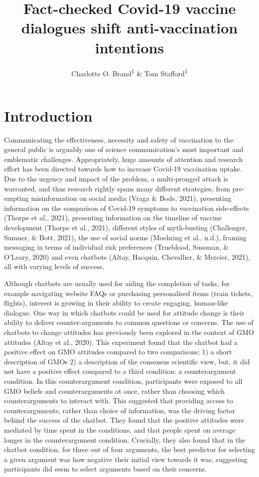 \documentclass[
  english,
  ,jou,floatsintext]{apa6}
\title{Fact-checked Covid-19 vaccine dialogues shift anti-vaccination intentions}
\author{Charlotte O. Brand\textsuperscript{1} \& Tom Stafford\textsuperscript{1}}
\date{}
\affiliation{\vspace{0.5cm}\textsuperscript{1} University of Sheffield, Department of Psychology}
\begin{document}
\maketitle

\hypertarget{introduction}{%
\section{Introduction}\label{introduction}}

Communicating the effectiveness, necessity and safety of vaccination to the general public is arguably one of science communication's most important and emblematic challenges. Appropriately, huge amounts of attention and research effort has been directed towards how to increase Covid-19 vaccination uptake. Due to the urgency and impact of the problem, a multi-pronged attack is warranted, and thus research rightly spans many different strategies, from pre-empting misinformation on social media (Vraga \& Bode, 2021), presenting information on the comparison of Covid-19 symptoms to vaccination side-effects (Thorpe et al., 2021), presenting information on the timeline of vaccine development (Thorpe et al., 2021), different styles of myth-busting (Challenger, Sumner, \& Bott, 2021), the use of social norms (Moehring et al., n.d.), framing messaging in terms of individual risk preferences (Trueblood, Sussman, \& O'Leary, 2020) and even chatbots (Altay, Hacquin, Chevallier, \& Mercier, 2021), all with varying levels of success.

Although chatbots are usually used for aiding the completion of tasks, for example navigating website FAQs or purchasing personalised items (train tickets, flights), interest is growing in their ability to create engaging, human-like dialogue. One way in which chatbots could be used for attitude change is their ability to deliver counter-arguments to common questions or concerns. The use of chatbots to change attitudes has previously been explored in the context of GMO attitudes (Altay et al., 2020). This experiment found that the chatbot had a positive effect on GMO attitudes compared to two comparisons; 1) a short description of GMOs 2) a description of the consensus scientific view, but, it did not have a positive effect compared to a third condition: a counterargument condition. In this counterargument condition, participants were exposed to all GMO beliefs and counterarguments at once, rather than choosing which counterarguments to interact with. This suggested that providing access to counterarguments, rather than choice of information, was the driving factor behind the success of the chatbot. They found that the positive attitudes were mediated by time spent in the conditions, and that people spent on average longer in the counterargument condition. Crucially, they also found that in the chatbot condition, for three out of four arguments, the best predictor for selecting a given argument was how negative their initial view towards it was, suggesting participants did seem to select arguments based on their concerns.
\end{document}
